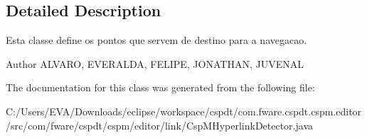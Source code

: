 \subsection{Detailed Description}
Esta classe define os pontos que servem de destino para a navegacao. 

\begin{DoxyAuthor}{Author}
A\+L\+V\+A\+RO, E\+V\+E\+R\+A\+L\+DA, F\+E\+L\+I\+PE, J\+O\+N\+A\+T\+H\+AN, J\+U\+V\+E\+N\+AL 
\end{DoxyAuthor}


The documentation for this class was generated from the following file\+:\begin{DoxyCompactItemize}
\item 
C\+:/\+Users/\+E\+V\+A/\+Downloads/eclipse/workspace/cspdt/com.\+fware.\+cspdt.\+cspm.\+editor/src/com/fware/cspdt/cspm/editor/link/Csp\+M\+Hyperlink\+Detector.\+java\end{DoxyCompactItemize}
